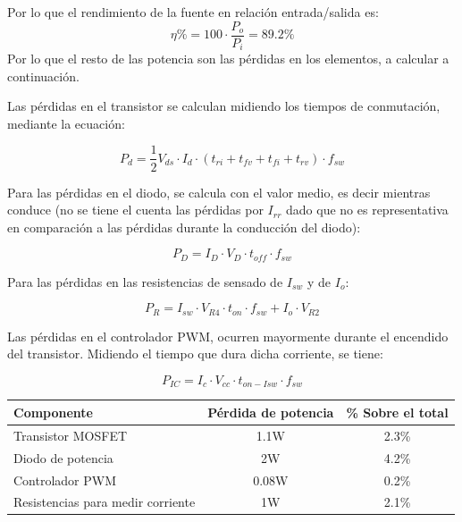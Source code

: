 \documentclass[e4_tp2_main.tex]{subfiles}
\begin{document}
Por lo que el rendimiento de la fuente en relación entrada/salida es:
\[
\eta \% = 100 \cdot \frac{P_o}{P_i} = 89.2 \%
\]
Por lo que el resto de las potencia son las pérdidas en los elementos, a calcular a continuación.\par

Las pérdidas en el transistor se calculan midiendo los tiempos de conmutación, mediante la ecuación:

\[
P_d = \frac{1}{2} V_{ds} \cdot I_d \cdot (t_{ri} + t_{fv} + t_{fi} + t_{rv}) \cdot f_{sw}
\]

Para las pérdidas en el diodo, se calcula con el valor medio, es decir mientras conduce (no se tiene el cuenta las pérdidas por $I_{rr}$ dado que no es representativa en comparación a las pérdidas durante la conducción del diodo):

\[
P_D = I_D \cdot V_D \cdot t_{off} \cdot f_{sw}
\]

Para las pérdidas en las resistencias de sensado de $I_{sw}$ y de $I_o$:

\[
P_{R} = I_{sw} \cdot V_{R4} \cdot t_{on} \cdot f_{sw} + I_o \cdot V_{R2} 
\]

Las pérdidas en el controlador PWM, ocurren mayormente durante el encendido del transistor. Midiendo el tiempo que dura dicha corriente, se tiene:

\[
P_{IC} = I_c \cdot V_{cc} \cdot t_{on-Isw} \cdot f_{sw}
\]

\begin{table}[h]
\centering
\begin{tabular}{|l|c|c|}
\hline
Componente                        & \multicolumn{1}{l|}{Pérdida de potencia} & \multicolumn{1}{l|}{\% Sobre el total} \\ \hline
Transistor MOSFET                 & 1.1W                                     & 2.3\%                                  \\ \hline
Diodo de potencia                 & 2W                                       & 4.2\%                                  \\ \hline
Controlador PWM                   & 0.08W                                    & 0.2\%                                  \\ \hline
Resistencias para medir corriente & 1W                                       & 2.1\%                                  \\ \hline
\end{tabular}
\end{table}
\end{document}
